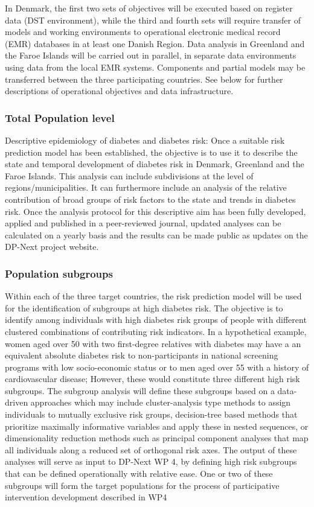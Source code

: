 \documentclass[11pt]{article}
\begin{document}
In Denmark, the first two sets of objectives will be executed based on register data (DST environment),
while the third and fourth sets will require transfer of models and working environments to operational
electronic medical record (EMR) databases in at least one Danish Region. Data analysis in Greenland and
the Faroe Islands will be carried out in parallel, in separate data environments using data from the
local EMR systems. Components and partial models may be transferred between the three participating
countries. See below for further descriptions of operational objectives and data infrastructure.

\subsubsection{Total Population level}
\label{sec:orgf503ef7}
Descriptive epidemiology of diabetes and diabetes risk: Once a suitable risk prediction model has been
established, the objective is to use it to describe the state and temporal development of diabetes risk
in Denmark, Greenland and the Faroe Islands. This analysis can include subdivisions at the level of
regions/municipalities. It can furthermore include an analysis of the relative contribution of broad
groups of risk factors to the state and trends in diabetes risk. Once the analysis protocol for this
descriptive aim has been fully developed, applied and published in a peer-reviewed journal, updated
analyses can be calculated on a yearly basis and the results can be made public as updates on the
DP-Next project website.

\subsubsection{Population subgroups}
\label{sec:org7309e9f}
Within each of the three target countries, the risk prediction model will be used for the
identification of subgroups at high diabetes risk. The objective is to identify among individuals
with high diabetes risk groups of people with different clustered combinations of contributing risk
indicators. In a hypothetical example, women aged over 50 with two first-degree relatives with diabetes
may have a an equivalent absolute diabetes risk to non-participants in national screening programs with
low socio-economic status or to men aged over 55 with a history of cardiovascular disease; However,
these would constitute three different high risk subgroups. The subgroup analysis will define these
subgroups based on a data-driven approaches which may include cluster-analysis type methods to assign
individuals to mutually exclusive risk groups, decision-tree based methods that prioritize maximally
informative variables and apply these in nested sequences, or dimensionality reduction methods such as
principal component analyses that map all individuals along a reduced set of orthogonal risk axes.
The output of these analyses will serve as input to DP-Next WP 4, by defining high risk subgroups
that can be defined operationally with relative ease. One or two of these subgroups will form the
target populations for the process of participative intervention development described in WP4
\end{document}
